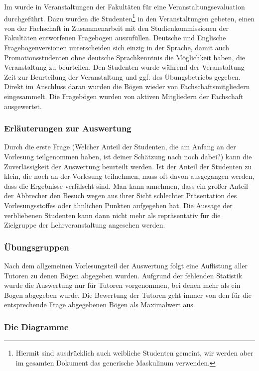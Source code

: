 Im \semesterlong{} wurde in Veranstaltungen der Fakultäten für
\facultylong{} eine Veranstaltungsevaluation durchgeführt.
Dazu wurden die Studenten\footnote{Hiermit sind ausdrücklich auch weibliche
Studenten gemeint, wir werden aber im gesamten Dokument das generische
Maskulinum verwenden.} in den Veranstaltungen gebeten, einen von der
Fachschaft in Zusammenarbeit mit den Studienkommissionen der Fakultäten
entworfenen Fragebogen auszufüllen. 
Deutsche und Englische Fragebogenversionen
unterscheiden sich einzig in der Sprache, damit auch
Promotionsstudenten ohne deutsche Sprachkenntnis die Möglichkeit
haben, die Veranstaltung zu beurteilen. 
Den Studenten wurde während der Veranstaltung Zeit zur Beurteilung der
Veranstaltung und ggf. des Übungsbetriebs gegeben. Direkt im Anschluss daran wurden die Bögen wieder
von Fachschaftsmitgliedern eingesammelt. Die Fragebögen wurden von
aktiven Mitgliedern der Fachschaft ausgewertet.


\subsubsection{Erläuterungen zur Auswertung}
Durch die erste Frage (\glqq Welcher Anteil der Studenten, die am Anfang an
der Vorlesung teilgenommen haben, ist deiner
Schätzung nach noch dabei?\grqq{}) kann die 
Zuverlässigkeit der Auswertung beurteilt werden. Ist der Anteil der
Studenten zu klein, die noch an 
der Vorlesung teilnehmen, muss oft davon ausgegangen werden, dass
die Ergebnisse verfälscht sind. Man kann annehmen, dass ein großer Anteil 
der Abbrecher den Besuch wegen aus ihrer Sicht schlechter Präsentation
des Vorlesungsstoffes oder ähnlichen Punkten aufgegeben hat. Die Aussage der 
verbliebenen Studenten kann dann nicht mehr als repräsentativ für die 
Zielgruppe der Lehrveranstaltung angesehen werden. 

\subsubsection{Übungsgruppen}
Nach dem allgemeinen Vorlesungsteil der Auswertung folgt eine Auflistung aller Tutoren zu denen Bögen abgegeben wurden. Aufgrund der fehlenden Statistik wurde die Auswertung nur für Tutoren vorgenommen, bei denen mehr als ein Bogen abgegeben wurde. Die Bewertung der Tutoren geht immer von den für die entsprechende Frage abgegebenen Bögen als Maximalwert aus.

\subsubsection{Die Diagramme}

